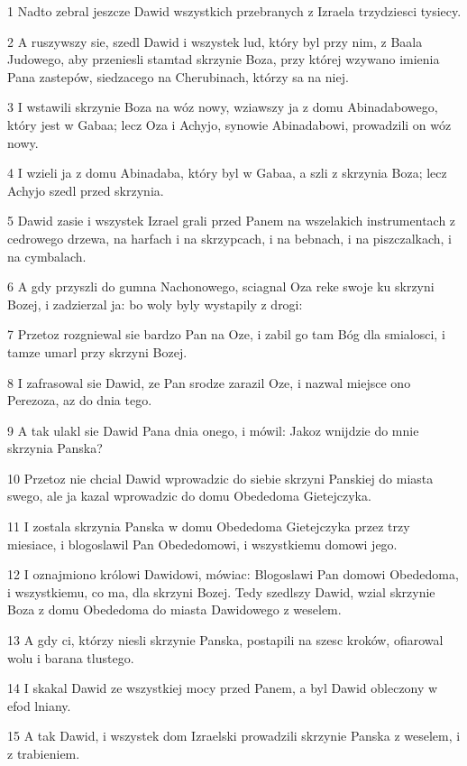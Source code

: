\par 1 Nadto zebral jeszcze Dawid wszystkich przebranych z Izraela trzydziesci tysiecy.
\par 2 A ruszywszy sie, szedl Dawid i wszystek lud, który byl przy nim, z Baala Judowego, aby przeniesli stamtad skrzynie Boza, przy której wzywano imienia Pana zastepów, siedzacego na Cherubinach, którzy sa na niej.
\par 3 I wstawili skrzynie Boza na wóz nowy, wziawszy ja z domu Abinadabowego, który jest w Gabaa; lecz Oza i Achyjo, synowie Abinadabowi, prowadzili on wóz nowy.
\par 4 I wzieli ja z domu Abinadaba, który byl w Gabaa, a szli z skrzynia Boza; lecz Achyjo szedl przed skrzynia.
\par 5 Dawid zasie i wszystek Izrael grali przed Panem na wszelakich instrumentach z cedrowego drzewa, na harfach i na skrzypcach, i na bebnach, i na piszczalkach, i na cymbalach.
\par 6 A gdy przyszli do gumna Nachonowego, sciagnal Oza reke swoje ku skrzyni Bozej, i zadzierzal ja: bo woly byly wystapily z drogi:
\par 7 Przetoz rozgniewal sie bardzo Pan na Oze, i zabil go tam Bóg dla smialosci, i tamze umarl przy skrzyni Bozej.
\par 8 I zafrasowal sie Dawid, ze Pan srodze zarazil Oze, i nazwal miejsce ono Perezoza, az do dnia tego.
\par 9 A tak ulakl sie Dawid Pana dnia onego, i mówil: Jakoz wnijdzie do mnie skrzynia Panska?
\par 10 Przetoz nie chcial Dawid wprowadzic do siebie skrzyni Panskiej do miasta swego, ale ja kazal wprowadzic do domu Obededoma Gietejczyka.
\par 11 I zostala skrzynia Panska w domu Obededoma Gietejczyka przez trzy miesiace, i blogoslawil Pan Obededomowi, i wszystkiemu domowi jego.
\par 12 I oznajmiono królowi Dawidowi, mówiac: Blogoslawi Pan domowi Obededoma, i wszystkiemu, co ma, dla skrzyni Bozej. Tedy szedlszy Dawid, wzial skrzynie Boza z domu Obededoma do miasta Dawidowego z weselem.
\par 13 A gdy ci, którzy niesli skrzynie Panska, postapili na szesc kroków, ofiarowal wolu i barana tlustego.
\par 14 I skakal Dawid ze wszystkiej mocy przed Panem, a byl Dawid obleczony w efod lniany.
\par 15 A tak Dawid, i wszystek dom Izraelski prowadzili skrzynie Panska z weselem, i z trabieniem.
